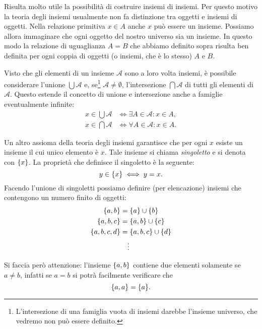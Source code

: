 Risulta molto utile la possibilità di costruire insiemi di insiemi.
Per questo motivo la teoria degli insiemi usualmente non fa distinzione
tra oggetti e insiemi di oggetti. Nella relazione primitiva $x\in A$ anche
$x$ può essere un insieme. Possiamo allora immaginare che ogni oggetto del
nostro universo sia un insieme. In questo modo la relazione di uguaglianza $A=B$
che abbiamo definito sopra risulta ben definita per ogni coppia di oggetti
(o insiemi, che è lo stesso) $A$ e $B$.

Visto che gli elementi di un insieme $\mathcal A$ sono a loro volta insiemi,
è possibile considerare l'unione $\bigcup \mathcal A$
e, se\footnote{%
L'intersezione di una famiglia vuota di insiemi darebbe l'insieme 
universo, che vedremo non può essere definito.
} 
$\mathcal A \neq \emptyset$, l'intersezione $\bigcap \mathcal A$ di tutti gli elementi
di $\mathcal A$.
Questo estende il concetto di unione e intersezione anche a famiglie
eventualmente infinite:
\begin{align*}
  x \in \bigcup \mathcal A & \iff \exists A \in \mathcal A \colon x\in A, \\
  x \in \bigcap \mathcal A & \iff \forall A \in \mathcal A \colon x\in A.
\end{align*}

Un altro assioma della teoria degli insiemi garantisce che per ogni
$x$ esiste un insieme il cui unico elemento è $x$. Tale insieme
si chiama \emph{singoletto} e si denota con ${\left\{ x \right\}}$. La proprietà
che definisce il singoletto è la seguente:
\[
  y \in {\left\{ x \right\}} \iff y=x.
\]
Facendo l'unione di singoletti possiamo definire (per elencazione) insiemi che contengono
un numero finito di oggetti:
\begin{align*}
  {\left\{ a,b \right\}} &= {\left\{ a \right\}} \cup {\left\{ b \right\}} \\
  {\left\{ a, b, c \right\}} &= {\left\{ a,b \right\}} \cup {\left\{ c \right\}}\\
  {\left\{ a, b, c, d \right\}} &= {\left\{ a,b,c \right\}} \cup {\left\{ d \right\}}\\
  &\quad\vdots
\end{align*}

Si faccia però attenzione: l'insieme ${\left\{ a,b \right\}}$ contiene due elementi
solamente se $a\neq b$, infatti se $a=b$ si potrà facilmente verificare
che
\begin{equation}\label{eq:4775523}
{\left\{ a,a \right\}} = {\left\{ a \right\}}.
\end{equation}

